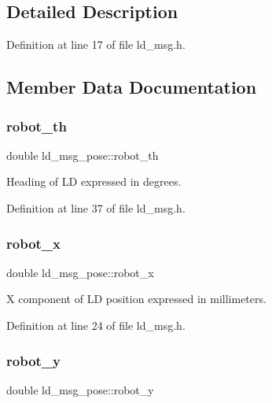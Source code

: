 \subsection{Detailed Description}


Definition at line 17 of file ld\+\_\+msg.\+h.



\subsection{Member Data Documentation}
\mbox{\label{structld__msg__pose_a0bc12453bebcdb0a0052149bfe585367}} 
\subsubsection{\texorpdfstring{robot\+\_\+th}{robot\_th}}
{\footnotesize\ttfamily double ld\+\_\+msg\+\_\+pose\+::robot\+\_\+th}

Heading of LD expressed in degrees. 

Definition at line 37 of file ld\+\_\+msg.\+h.

\mbox{\label{structld__msg__pose_a30c84490978ccf4a9092a15346d5cac0}} 
\subsubsection{\texorpdfstring{robot\+\_\+x}{robot\_x}}
{\footnotesize\ttfamily double ld\+\_\+msg\+\_\+pose\+::robot\+\_\+x}

X component of LD position expressed in millimeters. 

Definition at line 24 of file ld\+\_\+msg.\+h.

\mbox{\label{structld__msg__pose_ad0b8cca5ea09c38753c6b37197de67c4}} 
\subsubsection{\texorpdfstring{robot\+\_\+y}{robot\_y}}
{\footnotesize\ttfamily double ld\+\_\+msg\+\_\+pose\+::robot\+\_\+y}

